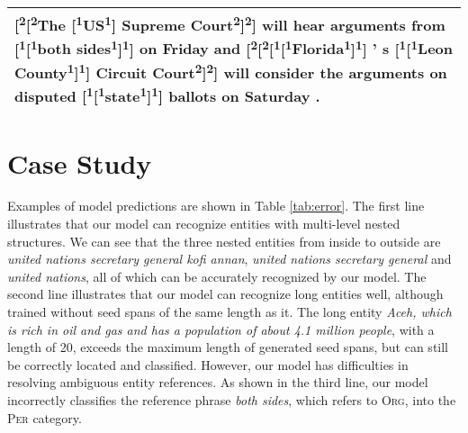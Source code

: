 \documentclass[11pt,a4paper]{article}
\begin{document}
\begin{table*}
\begin{tabular}{m{15.5cm}}
    \midrule
    {\color{red}[\textsuperscript{2}}{\color{blue}[\textsuperscript{2}}The {\color{blue}[\textsuperscript{1}}US{\color{blue}\textsuperscript{1}]} Supreme Court{\color{blue}\textsuperscript{2}]}{\color{red}\textsuperscript{2}]} will hear arguments from {\color{red}[\textsuperscript{1}}{\color{blue}[\textsuperscript{1}}both sides{\color{blue}\textsuperscript{1}]}{\color{red}\textsuperscript{1}]} on Friday and {\color{red}[\textsuperscript{2}}{\color{blue}[\textsuperscript{2}}{\color{red}[\textsuperscript{1}}{\color{blue}[\textsuperscript{1}}Florida{\color{blue}\textsuperscript{1}]}{\color{red}\textsuperscript{1}]} ' s    {\color{red}[\textsuperscript{1}}{\color{blue}[\textsuperscript{1}}Leon County{\color{blue}\textsuperscript{1}]}{\color{red}\textsuperscript{1}]} Circuit Court{\color{blue}\textsuperscript{2}]}{\color{red}\textsuperscript{2}]} will consider the arguments on disputed    {\color{red}[\textsuperscript{1}}{\color{blue}[\textsuperscript{1}}state{\color{blue}\textsuperscript{1}]}{\color{red}\textsuperscript{1}]} ballots on Saturday .\\
  \bottomrule
 \end{tabular}
 \caption{Cases Study. Blue brackets indicate entities predicted by the model, red brackets indicate true entities, the labels in the lower right corner indicate the type of entity, and the superscripts indicate the level of the nesting.}
  \label{tab:error}
\end{table*}










\section{Case Study}

Examples of model predictions are shown in Table \ref{tab:error}. The first line illustrates that our model can recognize entities with multi-level nested structures. We can see that the three nested entities from inside to outside are {\textit{united nations secretary general kofi annan}}, {\textit{united nations secretary general}} and {\textit{united nations}}, all of which can be accurately recognized by our model. The second line illustrates that our model can recognize long entities well, although trained without seed spans of the same length as it. The long entity {\textit{Aceh, which is rich in oil and gas and has a  population of about 4.1 million people}}, with a length of 20, exceeds the maximum length of generated seed spans, but can still be correctly located and classified.
However, our model has difficulties in resolving ambiguous entity references. As shown in the third line, our model incorrectly classifies the reference phrase \textit{both sides}, which refers to \textsc{Org}, into the \textsc{Per} category.
\end{document}
